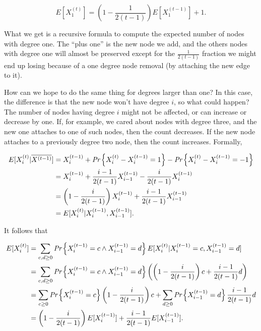 \begin{lem}\label{pa_lem1}
	\begin{equation}
		E[X_1^{(t)}] = \left(1 - \frac{1}{2(t-1)}\right)E[X_1^{(t-1)}] + 1.
	\end{equation}
\end{lem}

What we get is a recursive formula to compute the expected number of nodes with degree one. The ``plus one'' is the new node we add, and the others nodes with degree one will almost be preserved except for the $\frac{1}{2(t-1)}$ fraction we might end up losing because of a one degree node removal (by attaching the new edge to it).

How can we hope to do the same thing for degrees larger than one? In this case, the difference is that the new node won't have degree $i$, so what could happen? The number of nodes having degree $i$ might not be affected, or can increase or decrease by one. If, for example, we cared about nodes with degree three, and the new one attaches to one of such nodes, then the count decreases. If the new node attaches to a previously degree two node, then the count increases. Formally,

\begin{align*}
E[X_i^{(t)} | \overline{X^{(t-1)}}] &= X_i^{(t-1)} + \emph{Pr}\left\{X_i^{(t)} -X_i^{(t-1)} = 1\right\} - \emph{Pr}\left\{X_i^{(t)} -X_i^{(t-1)} = -1\right\}\\
&= X_i^{(t-1)} + \frac{i-1}{2(t-1)}X_{i-1}^{(t-1)} -\frac{i}{2(t-1)}X_i^{(t-1)}\\
&=\left(1 -\frac{i}{2(t-1)}\right)X_i^{(t-1)} + \frac{i-1}{2(t-1)}X_{i-1}^{(t-1)}\\
&=E[X_i^{(t)} | X_i^{(t-1)}, X_{i-1}^{(t-1)}].
\end{align*}

It follows that

\begin{align*}
E[X_i^{(t)}] &= \sum_{c,d \geq 0}\emph{Pr}\left\{X_i^{(t-1)} = c \wedge X_{i-1}^{(t-1)} = d\right\}E[X_i^{(t)} | X_i^{(t-1)} = c,  X_{i-1}^{(t-1)} = d]\\
&= \sum_{c,d \geq 0}\emph{Pr}\left\{X_i^{(t-1)} = c \wedge X_{i-1}^{(t-1)} = d\right\}\left(\left(1-\frac{i}{2(t-1)}\right)c + \frac{i -1}{2(t-1)}d\right)\\
& = \sum_{c \geq 0}\emph{Pr}\left\{X_i^{(t-1)} = c\right\}\left(1-\frac{i}{2(t-1)}\right)c + \sum_{d \geq 0}\emph{Pr}\left\{X_{i-1}^{(t-1)} = d\right\}\frac{i -1}{2(t-1)}d\\
&=\left(1-\frac{i}{2(t-1)}\right)E[X_i^{(t-1)}] +\frac{i -1}{2(t-1)}E[X_{i-1}^{(t-1)}] .
\end{align*}

